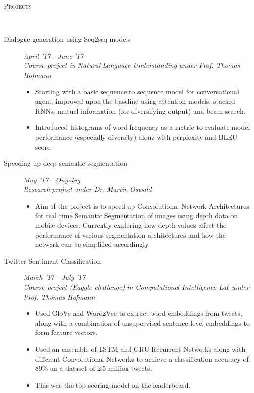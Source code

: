 \documentclass[9pt]{article}
\newenvironment{changemargin}[2]{%
  \begin{list}{}{%
    \setlength{\topsep}{0pt}%
    \setlength{\leftmargin}{#1}%
    \setlength{\rightmargin}{#2}%
    \setlength{\listparindent}{\parindent}%
    \setlength{\itemindent}{\parindent}%
    \setlength{\parsep}{\parskip}%
  }%
  \item[]}{\end{list}
}
\newcommand{\lineover}{
	\begin{changemargin}{-0.05in}{-0.10in}
		\vspace*{-9pt}
		\hrulefill \\
		\vspace*{-2pt}
	\end{changemargin}
}
\newcommand{\header}[1]{
	\begin{changemargin}{-0.5in}{-0.5in}
		\scshape{#1}\\
  	\lineover
	\end{changemargin}
}
\newenvironment{body} {
	\vspace*{-16pt}
	\begin{changemargin}{-0.6in}{-0.65in}
  }	
	{\end{changemargin}
}
\begin{document}
\header{Projects}
\begin{body}
	\vspace{14pt}
	
	\begin{description}
      
      \item[\normalsize{Dialogue generation using Seq2seq models}]
      \hfill \textit{April '17 - June '17} \\
      \textit{Course project in Natural Language Understanding under Prof. Thomas Hofmann}
      \begin{itemize}
      	\item Starting with a basic sequence to sequence model for conversational agent,
      	improved upon the baseline using attention models, stacked RNNs, mutual information (for diversifying output) and beam search.
      	\item Introduced histograms of word frequency as a metric to evaluate model 
      	performance (especially diversity) along with perplexity and BLEU score.
      \end{itemize}
      
     \item[\normalsize{Speeding up deep semantic segmentation}]
     \hfill \textit{May '17 - Ongoing} \\
     \textit{Research project under Dr. Martin Oswald}
     \begin{itemize}
     	\item Aim of the project is to speed up Convolutional Network Architectures for
     	real time Semantic Segmentation of images using depth data on mobile devices. Currently exploring how depth values affect the performance of various
     	segmentation architectures and how the network can be simplified accordingly.
     \end{itemize}
      
     \item[\normalsize{Twitter Sentiment Classification}] 
     \hfill	 \textit{March '17 - July '17} \\
     \textit{Course project (Kaggle challenge) in Computational Intelligence Lab under Prof. Thomas Hofmann}
     \begin{itemize}
     	\item Used GloVe and Word2Vec to extract word embeddings from tweets, along
     	with a combination of unsupervised sentence level embeddings to form feature
     	vectors.
     	\item Used an ensemble of LSTM and GRU Recurrent Networks along with different Convolutional Networks to achieve a classification accuracy of 89\% on a dataset of 2.5 million tweets. 
     	\item This was the top scoring model on the leaderboard. 
     \end{itemize}
 

\end{description}
\end{body}
\end{document}

